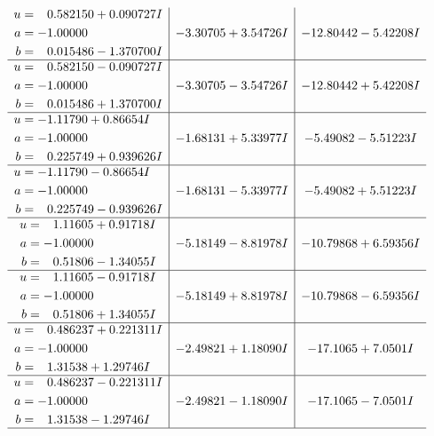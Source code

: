 \documentclass[1p]{elsarticle_modified}
\theoremstyle{definition}
\begin{document}
$$\begin{array}{c|c|c}
\begin{aligned}
u &= \phantom{-}0.582150 + 0.090727 I \\
a &= -1.00000\phantom{ +0.000000I} \\
b &= \phantom{-}0.015486 - 1.370700 I\end{aligned}
 & -3.30705 + 3.54726 I & -12.80442 - 5.42208 I \\ \hline\begin{aligned}
u &= \phantom{-}0.582150 - 0.090727 I \\
a &= -1.00000\phantom{ +0.000000I} \\
b &= \phantom{-}0.015486 + 1.370700 I\end{aligned}
 & -3.30705 - 3.54726 I & -12.80442 + 5.42208 I \\ \hline\begin{aligned}
u &= -1.11790 + 0.86654 I \\
a &= -1.00000\phantom{ +0.000000I} \\
b &= \phantom{-}0.225749 + 0.939626 I\end{aligned}
 & -1.68131 + 5.33977 I & -5.49082 - 5.51223 I \\ \hline\begin{aligned}
u &= -1.11790 - 0.86654 I \\
a &= -1.00000\phantom{ +0.000000I} \\
b &= \phantom{-}0.225749 - 0.939626 I\end{aligned}
 & -1.68131 - 5.33977 I & -5.49082 + 5.51223 I \\ \hline\begin{aligned}
u &= \phantom{-}1.11605 + 0.91718 I \\
a &= -1.00000\phantom{ +0.000000I} \\
b &= \phantom{-}0.51806 - 1.34055 I\end{aligned}
 & -5.18149 - 8.81978 I & -10.79868 + 6.59356 I \\ \hline\begin{aligned}
u &= \phantom{-}1.11605 - 0.91718 I \\
a &= -1.00000\phantom{ +0.000000I} \\
b &= \phantom{-}0.51806 + 1.34055 I\end{aligned}
 & -5.18149 + 8.81978 I & -10.79868 - 6.59356 I \\ \hline\begin{aligned}
u &= \phantom{-}0.486237 + 0.221311 I \\
a &= -1.00000\phantom{ +0.000000I} \\
b &= \phantom{-}1.31538 + 1.29746 I\end{aligned}
 & -2.49821 + 1.18090 I & -17.1065 + 7.0501 I \\ \hline\begin{aligned}
u &= \phantom{-}0.486237 - 0.221311 I \\
a &= -1.00000\phantom{ +0.000000I} \\
b &= \phantom{-}1.31538 - 1.29746 I\end{aligned}
 & -2.49821 - 1.18090 I & -17.1065 - 7.0501 I\\
 \hline 
 \end{array}$$\newpage\newpage\renewcommand{\arraystretch}{1}
\end{document}
